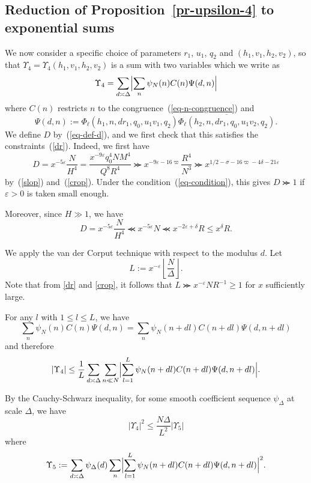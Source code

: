 \documentclass[12pt,a4paper,reqno]{amsart}
\numberwithin{equation}{section}
\theoremstyle{plain}
\theoremstyle{definition}
\newcommand\eps{\varepsilon}
\renewcommand{\sim}{\asymp}
\renewcommand{\lessapprox}{\llcurly}
\begin{document}
\subsection{Reduction of Proposition~\ref{pr-upsilon-4} to exponential
  sums}

We now consider a specific choice of parameters $r_1$, $u_1$, $q_2$ and
$(h_1,v_1,h_2,v_2)$, so that $\Upsilon_4=\Upsilon_4(h_1,v_1,h_2,v_2)$
is a sum with two variables which we write as
$$
\Upsilon_4= \sum_{d \sim \Delta} \Bigl|\sum_n \psi_N(n)
C(n)\Psi(d,n)\Bigr|
$$
where $C(n)$ restricts $n$ to the congruence~(\ref{eq-n-congruence}) and
\begin{equation}\label{psidn}
  \Psi(d,n):=  \Phi_{\ell}(h_1, n,dr_1,q_0,u_1v_1,q_2) 
  \overline{ \Phi_{\ell}(h_2,n, dr_1, q_0,u_1v_2,q_2) }.
\end{equation}
We define $D$ by~(\ref{eq-def-d}), and we first check that this
satisfies the constraints~(\ref{dr}). Indeed, we first have
$$
D=x^{-5\eps}\frac{N}{H^4}=\frac{x^{-9\eps}q_0^4NM^4}{Q^8R^4} \ggcurly
x^{-9\eps-16\varpi}\frac{R^4}{N^3}\ggcurly
x^{1/2-\sigma-16\varpi-4\delta-21\eps}
$$
by~(\ref{slop}) and~(\ref{crop}). Under the
condition~(\ref{eq-condition}), this gives $D\ggcurly 1$ if $\eps>0$
is taken small enough.
\par
Moreover, since $H\gg 1$, we have
$$
D=x^{-5\eps}\frac{N}{H^4}\lessapprox x^{-5\eps}N\lessapprox
x^{-2\eps+\delta}R\leq x^{\delta}R.
$$

We apply the van der Corput technique with respect to the modulus $d$.
Let
\begin{equation}\label{ldf}
L := x^{-\eps} \left\lfloor \frac{N}{\Delta} \right\rfloor.
\end{equation}
Note that from \eqref{dr} and \eqref{crop}, it follows that $L
\ggcurly x^{-\eps}NR^{-1} \geq 1$ for $x$ sufficiently large.
\par
For any $l$ with $1\leq l\leq L$, we have
$$
\sum_n \psi_N(n)C(n) \Psi(d,n)= \sum_n \psi_N(n+dl)C(n+dl)
\Psi(d,n+dl)
$$
and therefore
$$
|\Upsilon_4|\leq \frac{1}{L}\sum_{d \sim \Delta} \sum_{n\ll N} \Bigl|
\sum_{l=1}^L \psi_N(n+dl) C(n+dl)\Psi(d,n+dl)\Bigr|.
$$
\par
By the Cauchy-Schwarz inequality, for some smooth coefficient sequence
$\psi_{\Delta}$ at scale $\Delta$, we have
\begin{equation}\label{eq-upsilon-4}
|\Upsilon_4|^2\leq \frac{N\Delta}{L^2} | \Upsilon_5|
\end{equation}
where
$$
\Upsilon_5:=\sum_{d\sim \Delta} \psi_{\Delta}(d) \sum_n \Bigl| \sum_{l=1}^L
\psi_N(n+dl) C(n+dl)\Psi(d,n+dl)\Bigr|^2.
$$
\par
\end{document}
